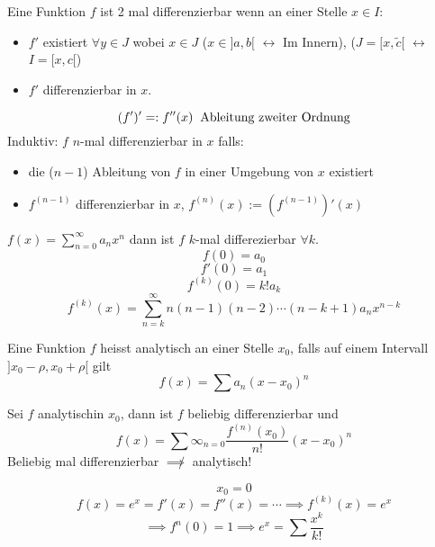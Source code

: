\begin{Def}
  Eine Funktion $f$ ist 2 mal differenzierbar wenn an einer Stelle $x\in I$:
  \begin{itemize}
    \item $f'$ existiert $\forall y\in J$ wobei $x\in J$ ($x\in ]a,b[$ $\leftrightarrow$ Im Innern), ($J=[x,\tilde c[$ $\leftrightarrow$ $I=[x,c[$)
    \item $f'$ differenzierbar in $x$.
  \end{itemize}
  \[(f')'=:f''(x)\hspace{2mm}\text{Ableitung zweiter Ordnung}\]
  Induktiv: $f$ $n$-mal differenzierbar in $x$ falls:
  \begin{itemize}
    \item die ($n-1$) Ableitung von $f$ in einer Umgebung von $x$ existiert
    \item $f^{(n-1)}$ differenzierbar in $x$, $f^{(n)}(x):=\left( f^{(n-1)} \right)'(x)$
  \end{itemize}
\end{Def}
\begin{Bem}
  $f(x)=\sum^\infty_{n=0}a_nx^n$ dann ist $f$ $k$-mal differezierbar $\forall k$.
  \[f(0)=a_0\]
  \[f'(0)=a_1\]
  \[f^{(k)}(0)=k!a_k\]
  \[f^{(k)}(x)=\sum^\infty_{n=k}n(n-1)(n-2)\cdots(n-k+1)a_nx^{n-k}\]
\end{Bem}
\begin{Def}
  Eine Funktion $f$ heisst analytisch an einer Stelle $x_0$, falls auf einem Intervall $]x_0-\rho, x_0+\rho[$ gilt
  \[f(x)=\sum a_n(x-x_0)^n\]
\end{Def}
\begin{Kor}
  Sei $f$ analytischin $x_0$, dann ist $f$ beliebig differenzierbar und
  \[f(x)=\sum\infty_{n=0}\frac{f^{(n)}(x_0)}{n!}(x-x_0)^n\]
  Beliebig mal differenzierbar $\not\implies$ analytisch!
\end{Kor}
\begin{Bsp}
  \[x_0=0\]
  \[f(x)=e^x=f'(x)=f''(x)=\cdots\implies f^{(k)}(x)=e^x\]
  \[\implies f^n(0)=1\implies e^x=\sum\frac{x^k}{k!}\]
\end{Bsp}
